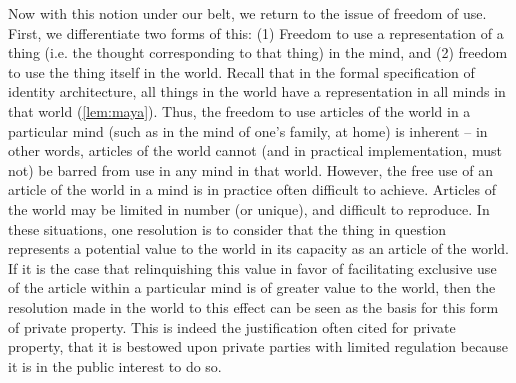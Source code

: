 \documentclass[pra,twocolumn,groupedaddress,10pt]{revtex4}
\theoremstyle{definition}
\begin{document}
Now with this notion under our belt, we return to the issue of freedom of use. First, we differentiate two forms of this: (1) Freedom to use a representation of a thing (i.e. the thought corresponding to that thing) in the mind, and (2) freedom to use the thing itself in the world. Recall that in the formal specification of identity architecture, all things in the world have a representation in all minds in that world (\autoref{lem:maya}). Thus, the freedom to use articles of the world in a particular mind (such as in the mind of one's family, at home) is inherent -- in other words, articles of the world cannot (and in practical implementation, must not) be barred from use in any mind in that world. However, the free use of an article of the world in a mind is in practice often difficult to achieve. Articles of the world may be limited in number (or unique), and difficult to reproduce. In these situations, one resolution is to consider that the thing in question represents a potential value to the world in its capacity as an article of the world. If it is the case that relinquishing this value in favor of facilitating exclusive use of the article within a particular mind is of greater value to the world, then the resolution made in the world to this effect can be seen as the basis for this form of private property. This is indeed the justification often cited for private property, that it is bestowed upon private parties with limited regulation because it is in the public interest to do so.
\end{document}
